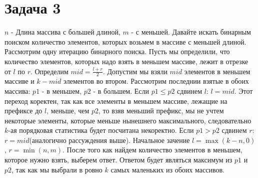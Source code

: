 \documentclass{article}
\begin{document}
	\section*{Задача 3}
	$n$ - Длина массива с большей длиной, $m$ - с меньшей. Давайте искать бинарным поиском количество элементов, которых возьмем в массиве с меньшей длиной. Рассмотрим одну итерацию бинарного поиска. Пусть мы определили, что количество элементов, которых надо взять в меньшем массиве, лежит в отрезке от $l$ по $r$. Определим $mid = \frac{l + r}{2}$. Допустим мы взяли $mid$ элементов в меньшем массиве и $k - mid$ элементов во втором. Рассмотрим последнии взятые в обоих массива: $p1$ - в меньшем, $p2$ - в большем.	Если $p1 \leq p2$ сдвинем $l$: $l = mid$. Этот переход коректен, так как все элементы в меньшем массиве, лежащие на префиксе до $l$, меньше, чем $p2$, то взяв меньший префикс, мы не учтем некоторые элементы, которые меньше нынешнего максимального, следовательно $k$-ая порядковая статистика будет посчитана некоректно. Если $p1 > p2$ сдвинем $r$: $r = mid$(аналогично рассуждения выше). Начальное зачение $l = \max(k - n, 0)$, $r = \min(n, m)$. После того как найдем количество элементов в меньшем, которое нужно взять, выберем ответ. Ответом будет являться максимум из $p1$ и $p2$, так как мы выбрали в ровно $k$ самых маленьких из обоих массивов.
	
	
\end{document}
